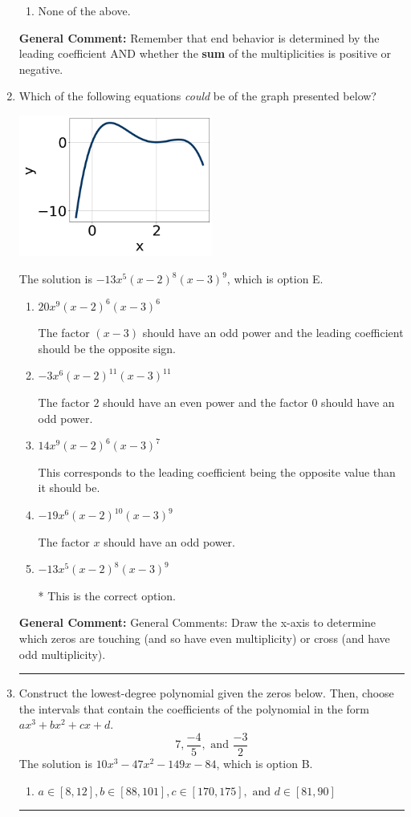 \documentclass{extbook}[14pt]
\newcommand{\litem}[1]{\item #1

\rule{\textwidth}{0.4pt}}
\begin{document}
\begin{enumerate}
{\begin{enumerate}[label=\Alph*.]
\begin{multicols}{2}
\end{multicols}\item None of the above.\end{enumerate}
\textbf{General Comment:} Remember that end behavior is determined by the leading coefficient AND whether the \textbf{sum} of the multiplicities is positive or negative.
}
\litem{
Which of the following equations \textit{could} be of the graph presented below?

\begin{center}
    \includegraphics[width=0.5\textwidth]{../Figures/polyGraphToFunctionC.png}
\end{center}


The solution is \( -13x^{5} (x - 2)^{8} (x - 3)^{9} \), which is option E.\begin{enumerate}[label=\Alph*.]
\item \( 20x^{9} (x - 2)^{6} (x - 3)^{6} \)

The factor $(x - 3)$ should have an odd power and the leading coefficient should be the opposite sign.
\item \( -3x^{6} (x - 2)^{11} (x - 3)^{11} \)

The factor $2$ should have an even power and the factor $0$ should have an odd power.
\item \( 14x^{9} (x - 2)^{6} (x - 3)^{7} \)

This corresponds to the leading coefficient being the opposite value than it should be.
\item \( -19x^{6} (x - 2)^{10} (x - 3)^{9} \)

The factor $x$ should have an odd power.
\item \( -13x^{5} (x - 2)^{8} (x - 3)^{9} \)

* This is the correct option.
\end{enumerate}

\textbf{General Comment:} General Comments: Draw the x-axis to determine which zeros are touching (and so have even multiplicity) or cross (and have odd multiplicity).
}
\litem{
Construct the lowest-degree polynomial given the zeros below. Then, choose the intervals that contain the coefficients of the polynomial in the form $ax^3+bx^2+cx+d$.
\[ 7, \frac{-4}{5}, \text{ and } \frac{-3}{2} \]The solution is \( 10x^{3} -47 x^{2} -149 x -84 \), which is option B.\begin{enumerate}[label=\Alph*.]
\item \( a \in [8, 12], b \in [88, 101], c \in [170, 175], \text{ and } d \in [81, 90] \)


\end{enumerate}}
\end{enumerate}
\end{document}
